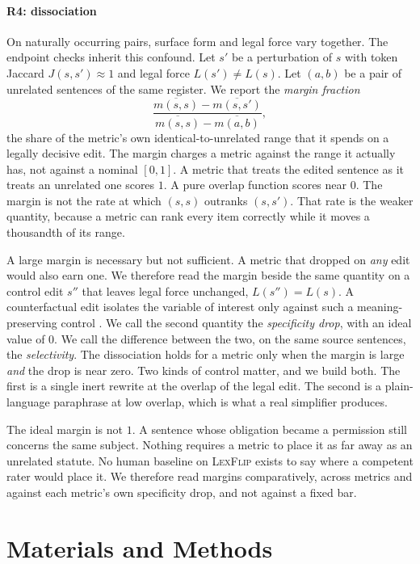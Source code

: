 \documentclass{BVP_JCLLT}
\newcommand{\rev}[1]{#1}
\newcommand{\rev}[1]{{\color{revcol}#1}}
\begin{document}
{\paragraph{R4: dissociation}
On naturally occurring pairs, surface form and legal force vary together. The
endpoint checks inherit this confound. Let $s'$ be a perturbation of $s$ with
token Jaccard $J(s,s') \approx 1$ and legal force $L(s') \neq L(s)$. \rev{Let $(a,b)$ be a pair of unrelated
sentences of the same register.} We report the
\emph{margin fraction}
\[
\frac{\overline{m(s,s)} - \overline{m(s,s')}}{\overline{m(s,s)} - \overline{m(a,b)}},
\]
the share of the metric's own identical-to-unrelated range that it spends on a
legally decisive edit. The margin charges a metric against the range it actually
has, not against a nominal $[0,1]$. A metric that treats the edited sentence as
it treats an unrelated one scores $1$. A pure overlap function scores near $0$.
The margin is not the rate at which $(s,s)$ outranks $(s,s')$. That rate is the
weaker quantity, because a metric can rank every item correctly while it moves a
thousandth of its range.

A large margin is necessary but not sufficient. A metric that dropped on
\emph{any} edit would also earn one. We therefore read the margin beside the
same quantity on a control edit $s''$ that leaves legal force unchanged,
$L(s'')=L(s)$. A counterfactual edit isolates the variable of interest only
against such a meaning-preserving control \cite{yang2026compared}. We call the
second quantity the \emph{specificity drop}, with an ideal value of $0$. We call
the difference between the two, on the same source sentences, the
\emph{selectivity}. The dissociation holds for a metric only when the margin is
large \emph{and} the drop is near zero. Two kinds of control matter, and we
build both. The first is a single inert rewrite at the overlap of the legal
edit. The second is a plain-language paraphrase at low overlap, which is what a
real simplifier produces.

The ideal margin is not $1$. A sentence whose obligation became a permission
still concerns the same subject. Nothing requires a metric to place it as far
away as an unrelated statute. No human baseline on \textsc{LexFlip} exists to say
where a competent rater would place it. We therefore read margins comparatively,
across metrics and against each metric's own specificity drop, and not against a
fixed bar.}

\section{Materials and Methods}\label{sec:methods}
\end{document}
